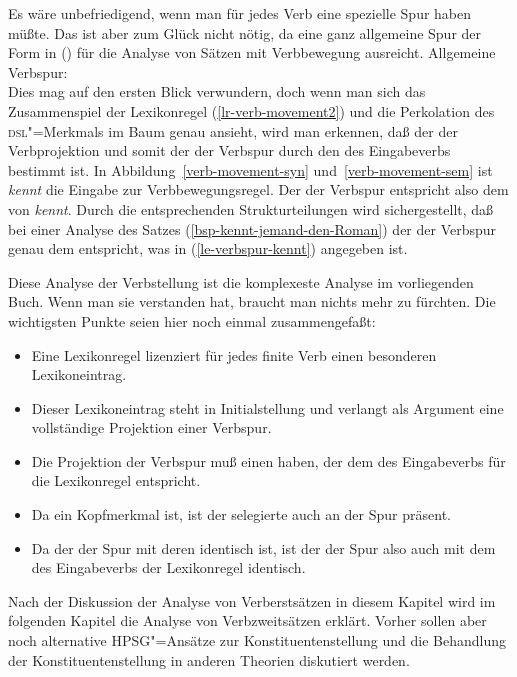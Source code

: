Es wäre unbefriedigend, wenn man für jedes Verb eine spezielle Spur haben müßte. Das ist aber 
zum Glück nicht nötig, da eine ganz allgemeine Spur der Form in () für die Analyse
von Sätzen mit Verbbewegung ausreicht.
\eas
Allgemeine Verbspur:\\
\label{le-verbspur}
\zs
Dies mag auf den ersten Blick verwundern, doch wenn man sich das Zusammenspiel der Lexikonregel
(\ref{lr-verb-movement2}) und die Perkolation des \textsc{dsl}"=Merkmals im Baum genau ansieht, wird
man erkennen, daß der \dslw der Verbprojektion und somit der \localw der Verbspur durch den
\localw des Eingabeverbs bestimmt ist. In Abbildung~\ref{verb-movement-syn} und~\ref{verb-movement-sem}
ist \emph{kennt} die Eingabe zur Verbbewegungsregel. Der \localw der Verbspur entspricht
also dem \localw von \emph{kennt}. Durch die entsprechenden Strukturteilungen wird  sichergestellt,
daß bei einer Analyse des Satzes (\ref{bsp-kennt-jemand-den-Roman}) der \localw der Verbspur genau dem entspricht, was in
(\ref{le-verbspur-kennt}) angegeben ist.

Diese Analyse der Verbstellung ist die komplexeste Analyse im vorliegenden Buch. Wenn man sie verstanden
hat, braucht man nichts mehr zu fürchten. Die wichtigsten Punkte seien hier noch einmal zusammengefaßt:
\begin{itemize}
\item Eine Lexikonregel lizenziert für jedes finite Verb einen besonderen Lexikoneintrag.
\item Dieser Lexikoneintrag steht in Initialstellung und verlangt als Argument eine vollständige Projektion
      einer Verbspur.
\item Die Projektion der Verbspur muß einen \dslw haben, der dem \localw des Eingabeverbs für die Lexikonregel
      entspricht.
\item Da \dsl ein Kopfmerkmal ist, ist der selegierte \dslw auch an der Spur präsent.
\item Da der \dslw der Spur mit deren \localw identisch ist, ist der \localw der Spur also
      auch mit dem \localw des Eingabeverbs der Lexikonregel identisch.
\end{itemize}

\noindent
Nach der Diskussion der Analyse von Verberstsätzen in diesem Kapitel wird im folgenden Kapitel
die Analyse von Verbzweitsätzen erklärt. Vorher sollen aber noch alternative HPSG"=Ansätze zur Konstituentenstellung
und die Behandlung der Konstituentenstellung in anderen Theorien diskutiert werden.

